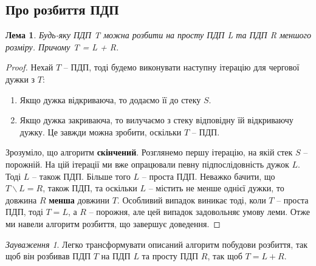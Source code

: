 \documentclass[
  11pt,
  a4paper
]{extarticle}
\newtheorem{lemma}{Лема}
\theoremstyle{definition}
\theoremstyle{remark}
\newtheorem*{remark}{Зауваження}
\begin{document}
  \subsection{Про розбиття ПДП}
    \begin{lemma}
      Будь-яку ПДП T можна розбити на просту ПДП L та ПДП R меншого розміру. Причому T = L + R.
    \end{lemma}
    \begin{proof}
      Нехай $T$ -- ПДП, тоді будемо виконувати наступну ітерацію для чергової дужки з $T$:
      \begin{enumerate}
      \item{Якщо дужка відкриваюча, то додаємо її до стеку $S$.}
      \item{Якщо дужка закриваюча, то вилучаємо з стеку відповідну їй відкриваючу дужку. Це завжди можна зробити, оскільки $T$ -- ПДП.}
      \end{enumerate}
      Зрозуміло, що алгоритм \textbf{скінчений}. Розглянемо першу ітерацію, на якій стек $S$ -- порожній. На цій ітерації ми вже опрацювали певну підпослідовність дужок $L$. Тоді $L$ -- також ПДП. Більше того $L$ -- проста ПДП. Неважко бачити, що $T\backslash L = R$, також ПДП, та оскільки $L$ -- містить не менше однієї дужки, то довжина $R$ \textbf{менша} довжини $T$. Особливий випадок виникає тоді, коли $T$ -- проста ПДП, тоді $T = L$, а $R$ -- порожня, але цей випадок задовольняє умову леми. Отже ми навели алгоритм розбиття, що завершує доведення.
    \end{proof}
    \begin{remark}
      Легко трансформувати описаний алгоритм побудови розбиття, так щоб він розбивав ПДП $T$ на ПДП $L$ та просту ПДП $R$, так щоб $T = L + R$.
    \end{remark}
\end{document}
